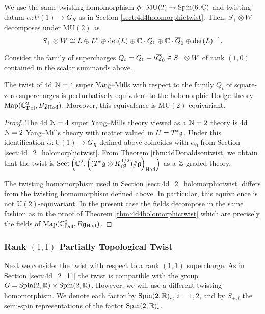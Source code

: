 \documentclass[10pt, oneside]{article}
\newcommand{\Hod}{\mathrm{Hod}}
\newcommand{\MU}{\mathrm{MU}}
\newcommand{\Sect}{\mathrm{Sect}}
\renewcommand{\U}{\mathrm{U}}
\newcommand{\ham}{/\!\!/}
\begin{document}
We use the same twisting homomorphism $\phi \colon \MU(2) \to \Spin(6;\CC)$ and twisting datum $\alpha \colon U(1) \to G_R$ as in Section \ref{sect:4d4holomorphictwist}.
Then, $S_+ \otimes W$ decomposes under $\MU(2)$ as
\[
S_+\otimes W\cong L\oplus L^*\oplus \det(L)\oplus \CC \cdot Q_0 \oplus \CC \cdot \Bar{Q}_0 \oplus \det(L)^{-1}.
\]

Consider the family of supercharges $Q_t = Q_0 + t \Bar{Q}_0 \in S_+\otimes W$ of rank $(1, 0)$ contained in the scalar summands above.

\begin{theorem}
The twist of 4d $\cN=4$ super Yang--Mills with respect to the family $Q_t$ of square-zero supercharges is perturbatively equivalent to the holomorphic Hodge theory $\map(\CC^2_{\rm Dol}, B \fg_{\rm Hod})$. 
Moreover, this equivalence is $\MU(2)$-equivariant.
\label{thm:4d4Atwist}
\end{theorem}
\begin{proof}
The 4d $\cN=4$ super Yang--Mills theory viewed as a $\cN=2$ theory is 4d $\cN=2$ Yang--Mills theory with matter valued in $U=T^*\fg$. 
Under this identification $\alpha\colon \U(1)\rightarrow G_R$ defined above coincides with $\alpha_0$ from Section \ref{sect:4d_2_holomorphictwist}. 
From Theorem \ref{thm:4dDonaldsontwist} we obtain that the twist is $\Sect\left(\CC^2, \left((T^*\fg \otimes K_{\CC^2}^{1/2})\ham \fg\right)_{\Hod}\right)$ as a $\ZZ$-graded theory. 

The twisting homomorphism used in Section \ref{sect:4d_2_holomorphictwist} differs from the twisting homomorphism defined above. 
In particular, this equivalence is not $\U(2)$-equivariant. In the present case the fields decompose in the same fashion as in the proof of Theorem \ref{thm:4d4holomorphictwist} which are precisely the fields of $\map(\CC^2_{\rm Dol}, B \fg_{\rm Hod})$.
\end{proof}

\subsubsection{Rank \texorpdfstring{$(1, 1)$}{(1,1)} Partially Topological Twist}
\label{sect:4d4partialtwist}

Next we consider the twist with respect to a rank $(1,1)$ supercharge. As in Section \ref{sect:4d_2_11} the twist is compatible with the group $G = \Spin(2, \RR) \times \Spin(2, \RR)$. However, we will use a different twisting homomorphism. We denote each factor by $\Spin(2, \RR)_i$, $i=1,2$, and by $S_{\pm, i}$ the semi-spin representations of the factor $\Spin(2, \RR)_i$.
\end{document}
